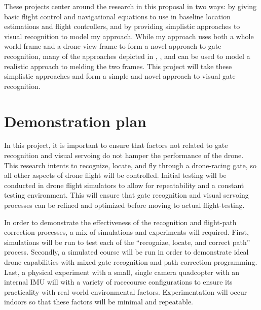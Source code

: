 \documentclass[onecolumn,10pt]{IEEEtran}
\begin{document}
These projects center around the research in this proposal in two ways: by giving basic flight control and navigational equations to use in baseline location estimations and flight controllers, and by providing simplistic approaches to visual recognition to model my approach. While my approach uses both a whole world frame and a drone view frame to form a novel approach to gate recognition, many of the approaches depicted in \cite{zhilenkov2018use}, \cite{jung2018perception}, and \cite{jung2018direct} can be used to model a realistic approach to melding the two frames. This project will take these simplistic approaches and form a simple and novel approach to visual gate recognition.








\section{Demonstration plan}
In this project, it is important to ensure that factors not related to gate recognition and visual servoing do not hamper the performance of the drone. This research intents to recognize, locate, and fly through a drone-racing gate, so all other aspects of drone flight will be controlled. Initial testing will be conducted in drone flight simulators to allow for repeatability and a constant testing environment. This will ensure that gate recognition and visual servoing processes can be refined and optimized before moving to actual flight-testing.

In order to demonstrate the effectiveness of the recognition and flight-path correction processes, a mix of simulations and experiments will required. First, simulations will be run to test each of the ``recognize, locate, and correct path'' process. Secondly, a simulated course will be run in order to demonstrate ideal drone capabilities with mixed gate recognition and path correction programming. Last, a physical experiment with a small, single camera quadcopter with an internal IMU will with a variety of racecourse configurations to ensure its practicality with real world environmental factors. Experimentation will occur indoors so that these factors will be minimal and repeatable. 





\end{document}
